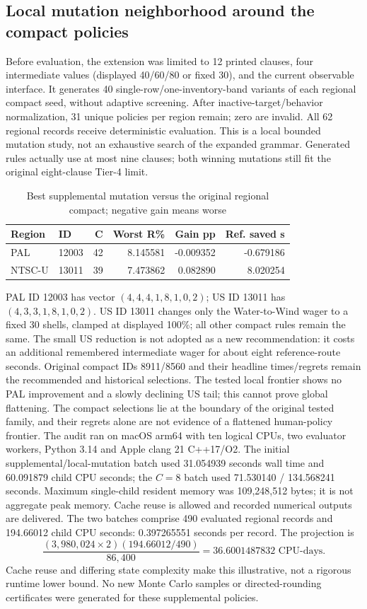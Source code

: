 \documentclass[11pt]{article}
\theoremstyle{definition}\newtheorem{definition}[theorem]{Definition}
\begin{document}
\subsection{Local mutation neighborhood around the compact policies}
Before evaluation, the extension was limited to 12 printed clauses, four intermediate values (displayed 40/60/80 or fixed 30), and the current observable interface. It generates 40 single-row/one-inventory-band variants of each regional compact seed, without adaptive screening. After inactive-target/behavior normalization, 31 unique policies per region remain; zero are invalid. All 62 regional records receive deterministic evaluation. This is a local bounded mutation study, not an exhaustive search of the expanded grammar. Generated rules actually use at most nine clauses; both winning mutations still fit the original eight-clause Tier-4 limit.
\begin{table}[H]\centering\small
\begin{tabular}{llrrrr}\toprule
Region & ID & C & Worst R\% & Gain pp & Ref. saved s\\\midrule
PAL & 12003 & 42 & 8.145581 & -0.009352 & -0.679186\\
NTSC-U & 13011 & 39 & 7.473862 & 0.082890 & 8.020254\\
\bottomrule\end{tabular}
\caption{Best supplemental mutation versus the original regional compact; negative gain means worse}\label{tab:tier5}\end{table}
PAL ID 12003 has vector $(4,4,4,1,8,1,0,2)$; US ID 13011 has $(4,3,3,1,8,1,0,2)$. US ID 13011 changes only the Water-to-Wind wager to a fixed 30 shells, clamped at displayed 100\%; all other compact rules remain the same. The small US reduction is not adopted as a new recommendation: it costs an additional remembered intermediate wager for about eight reference-route seconds. Original compact IDs 8911/8560 and their headline times/regrets remain the recommended and historical selections. The tested local frontier shows no PAL improvement and a slowly declining US tail; this cannot prove global flattening. The compact selections lie at the boundary of the original tested family, and their regrets alone are not evidence of a flattened human-policy frontier.
The audit ran on macOS arm64 with ten logical CPUs, two evaluator workers, Python 3.14 and Apple clang 21 C++17/O2. The initial supplemental/local-mutation batch used 31.054939 seconds wall time and 60.091879 child CPU seconds; the $C=8$ batch used 71.530140 / 134.568241 seconds. Maximum single-child resident memory was 109,248,512 bytes; it is not aggregate peak memory. Cache reuse is allowed and recorded numerical outputs are delivered. The two batches comprise 490 evaluated regional records and 194.66012 child CPU seconds: 0.397265551 seconds per record. The projection is
\[
 \frac{(3{,}980{,}024\times2)(194.66012/490)}{86{,}400}=36.6001487832\text{ CPU-days}.
\]
Cache reuse and differing state complexity make this illustrative, not a rigorous runtime lower bound. No new Monte Carlo samples or directed-rounding certificates were generated for these supplemental policies.
\end{document}
